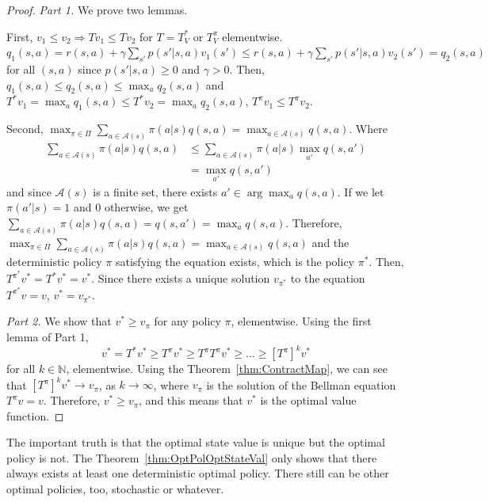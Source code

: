         \begin{proof}
            \textit{Part 1.} We prove two lemmas.

            First, $v_1 \leq v_2 \Rightarrow T v_1 \leq T v_2$ for $T=T^*_V \text{ or } T^\pi_V$ elementwise.
            $q_1(s,a) = r(s,a) + \gamma \sum_{s'} p(s'|s,a)v_1(s') \leq r(s,a) + \gamma \sum_{s'}p(s'|s,a)v_2(s') = q_2(s, a)$ for all $(s,a)$ since $p(s'|s,a) \geq 0$ and $\gamma > 0$.
            Then, $q_1(s,a) \leq q_2(s,a) \leq \max_a q_2(s, a)$ and $T^* v_1 = \max_a q_1(s,a) \leq T^* v_2 = \max_a q_2(s,a)$, $T^\pi v_1 \leq T^\pi v_2$.

            Second, $\max_{\pi \in \Pi} \sum_{a \in \mathcal{A}(s)} \pi(a|s)q(s,a) = \max_{a \in \mathcal{A}(s)}q(s,a)$. Where 
            \begin{align}
                \sum_{a \in \mathcal{A}(s)} \pi(a|s)q(s,a) &\leq \sum_{a \in \mathcal{A}(s)} \pi(a|s) \max_{a'}{q(s,a')} \\
                                                           &= \max_{a'}{q(s,a')}
            \end{align}
            and since $\mathcal{A}(s)$ is a finite set, there exists $a' \in \arg\max_a q(s,a)$. If we let $\pi(a'|s) = 1$ and 0 otherwise,
            we get $\sum_{a \in \mathcal{A}(s)} \pi(a|s)q(s,a) = q(s,a') = \max_a q(s,a)$. Therefore, $\max_{\pi \in \Pi} \sum_{a \in \mathcal{A}(s)} \pi(a|s)q(s,a) = \max_{a \in \mathcal{A}(s)}q(s,a)$
            and the deterministic policy $\pi$ satisfying the equation exists, which is the policy $\pi^*$. Then, $T^{\pi^*} v^* = T^* v^* = v^*$.
            Since there exists a unique solution $v_{\pi^*}$ to the equation $T^{\pi^*} v =  v$, $v^* = v_{\pi^*}$.
            
            \textit{Part 2.} We show that $v^* \geq v_\pi$ for any policy $\pi$, elementwise. Using the first lemma of Part 1,
            \begin{equation}
                v^* = T^* v^* \geq T^\pi v^* \geq T^\pi T^\pi v^* \geq \dots \geq [T^\pi]^k v^*
            \end{equation}
            for all $k \in \mathbb{N}$, elementwise. Using the Theorem~\ref{thm:ContractMap}, we can see that $[T^\pi]^k v^* \to v_\pi$, as $k \to \infty$,
            where $v_\pi$ is the solution of the Bellman equation $T^\pi v = v$. Therefore, $v^* \geq v_\pi$, and this means that $v^*$ is the optimal value function.
        \end{proof}
    
    The important truth is that the optimal state value is unique but the optimal policy is not. The Theorem~\ref{thm:OptPolOptStateVal}
    only shows that there always exists at least one deterministic optimal policy. There still can be other optimal policies, too, stochastic or whatever.

